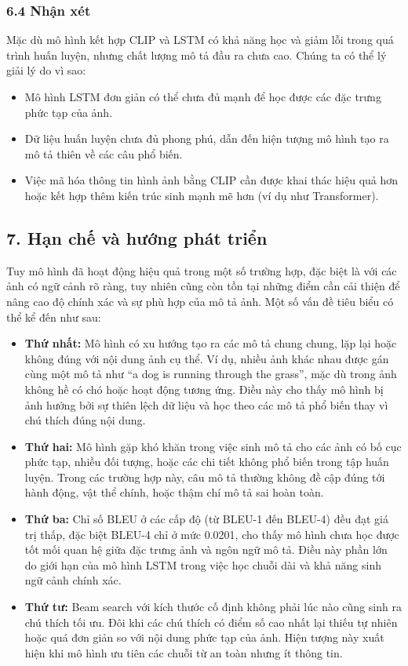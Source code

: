 \documentclass[../main.tex]{subfiles}
\begin{document}
\subsubsection*{6.4 Nhận xét}

Mặc dù mô hình kết hợp CLIP và LSTM có khả năng học và giảm lỗi trong quá trình huấn luyện, nhưng chất lượng mô tả đầu ra chưa cao. Chúng ta có thể lý giải lý do vì sao:
\begin{itemize}
    \item Mô hình LSTM đơn giản có thể chưa đủ mạnh để học được các đặc trưng phức tạp của ảnh.
    \item Dữ liệu huấn luyện chưa đủ phong phú, dẫn đến hiện tượng mô hình tạo ra mô tả thiên về các câu phổ biến.
    \item Việc mã hóa thông tin hình ảnh bằng CLIP cần được khai thác hiệu quả hơn hoặc kết hợp thêm kiến trúc sinh mạnh mẽ hơn (ví dụ như Transformer).
\end{itemize}

\subsection*{7. Hạn chế và hướng phát triển}

Tuy mô hình đã hoạt động hiệu quả trong một số trường hợp, đặc biệt là với các ảnh có ngữ cảnh rõ ràng, tuy nhiên cũng còn tồn tại những điểm cần cải thiện để nâng cao độ chính xác và sự phù hợp của mô tả ảnh. Một số vấn đề tiêu biểu có thể kể đến như sau:

\begin{itemize}
    \item \textbf{Thứ nhất: } Mô hình có xu hướng tạo ra các mô tả chung chung, lặp lại hoặc không đúng với nội dung ảnh cụ thể. Ví dụ, nhiều ảnh khác nhau được gán cùng một mô tả như “a dog is running through the grass”, mặc dù trong ảnh không hề có chó hoặc hoạt động tương ứng. Điều này cho thấy mô hình bị ảnh hưởng bởi sự thiên lệch dữ liệu và học theo các mô tả phổ biến thay vì chú thích đúng nội dung.
    \item \textbf{Thứ hai: } Mô hình gặp khó khăn trong việc sinh mô tả cho các ảnh có bố cục phức tạp, nhiều đối tượng, hoặc các chi tiết không phổ biến trong tập huấn luyện. Trong các trường hợp này, câu mô tả thường không đề cập đúng tới hành động, vật thể chính, hoặc thậm chí mô tả sai hoàn toàn.
    \item \textbf{Thứ ba: } Chỉ số BLEU ở các cấp độ (từ BLEU-1 đến BLEU-4) đều đạt giá trị thấp, đặc biệt BLEU-4 chỉ ở mức 0.0201, cho thấy mô hình chưa học được tốt mối quan hệ giữa đặc trưng ảnh và ngôn ngữ mô tả. Điều này phần lớn do giới hạn của mô hình LSTM trong việc học chuỗi dài và khả năng sinh ngữ cảnh chính xác.
    \item \textbf{Thứ tư: } Beam search với kích thước cố định không phải lúc nào cũng sinh ra chú thích tối ưu. Đôi khi các chú thích có điểm số cao nhất lại thiếu tự nhiên hoặc quá đơn giản so với nội dung phức tạp của ảnh. Hiện tượng này xuất hiện khi mô hình ưu tiên các chuỗi từ an toàn nhưng ít thông tin.
\end{itemize}
\end{document}

